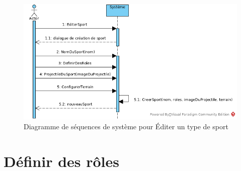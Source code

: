\begin{figure}[htpb]
    \centering
    \includegraphics[scale=0.6]{fig/ssd_ajouter_sport.png}
    \caption{Diagramme de s\'equences de syst\`eme pour \'Editer un type de sport}
    \label{fig:ssd_ajouter_sport}
\end{figure}

\section{Définir des rôles}
\label{sec:definir_des_roles}

